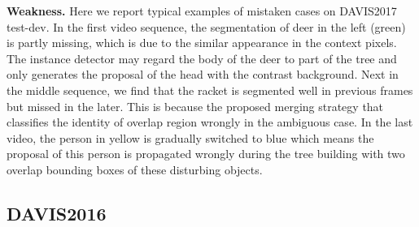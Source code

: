 \documentclass[10pt,twocolumn,letterpaper]{article}
\begin{document}
\textbf{Weakness.} Here we report typical examples of mistaken cases on DAVIS2017 test-dev. In the first video sequence, the segmentation of deer in the left (green) is partly missing, which is due to the similar appearance in the context pixels. The instance detector may regard the body of the deer to part of the tree and only generates the proposal of the head with the contrast background. Next in the middle sequence, we find that the racket is segmented well in previous frames but missed in the later. This is because the proposed merging strategy that classifies the identity of overlap region wrongly in the ambiguous case. In the last video, the person in yellow is gradually switched to blue which means the proposal of this person is propagated wrongly during the tree building with two overlap bounding boxes of these disturbing objects.

\subsection{DAVIS2016}
\vspace{-5pt}
\end{document}
